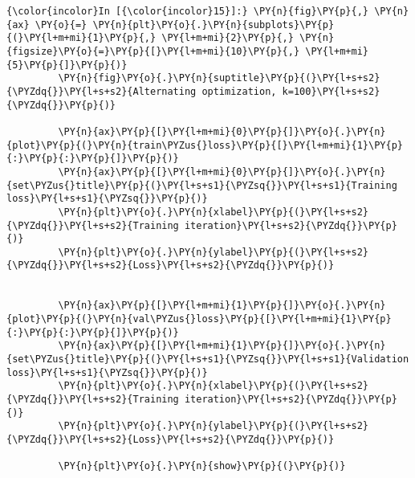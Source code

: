     \begin{Verbatim}[commandchars=\\\{\}]
{\color{incolor}In [{\color{incolor}15}]:} \PY{n}{fig}\PY{p}{,} \PY{n}{ax} \PY{o}{=} \PY{n}{plt}\PY{o}{.}\PY{n}{subplots}\PY{p}{(}\PY{l+m+mi}{1}\PY{p}{,} \PY{l+m+mi}{2}\PY{p}{,} \PY{n}{figsize}\PY{o}{=}\PY{p}{[}\PY{l+m+mi}{10}\PY{p}{,} \PY{l+m+mi}{5}\PY{p}{]}\PY{p}{)}
         \PY{n}{fig}\PY{o}{.}\PY{n}{suptitle}\PY{p}{(}\PY{l+s+s2}{\PYZdq{}}\PY{l+s+s2}{Alternating optimization, k=100}\PY{l+s+s2}{\PYZdq{}}\PY{p}{)}
         
         \PY{n}{ax}\PY{p}{[}\PY{l+m+mi}{0}\PY{p}{]}\PY{o}{.}\PY{n}{plot}\PY{p}{(}\PY{n}{train\PYZus{}loss}\PY{p}{[}\PY{l+m+mi}{1}\PY{p}{:}\PY{p}{:}\PY{p}{]}\PY{p}{)}
         \PY{n}{ax}\PY{p}{[}\PY{l+m+mi}{0}\PY{p}{]}\PY{o}{.}\PY{n}{set\PYZus{}title}\PY{p}{(}\PY{l+s+s1}{\PYZsq{}}\PY{l+s+s1}{Training loss}\PY{l+s+s1}{\PYZsq{}}\PY{p}{)}
         \PY{n}{plt}\PY{o}{.}\PY{n}{xlabel}\PY{p}{(}\PY{l+s+s2}{\PYZdq{}}\PY{l+s+s2}{Training iteration}\PY{l+s+s2}{\PYZdq{}}\PY{p}{)}
         \PY{n}{plt}\PY{o}{.}\PY{n}{ylabel}\PY{p}{(}\PY{l+s+s2}{\PYZdq{}}\PY{l+s+s2}{Loss}\PY{l+s+s2}{\PYZdq{}}\PY{p}{)}
         
         
         \PY{n}{ax}\PY{p}{[}\PY{l+m+mi}{1}\PY{p}{]}\PY{o}{.}\PY{n}{plot}\PY{p}{(}\PY{n}{val\PYZus{}loss}\PY{p}{[}\PY{l+m+mi}{1}\PY{p}{:}\PY{p}{:}\PY{p}{]}\PY{p}{)}
         \PY{n}{ax}\PY{p}{[}\PY{l+m+mi}{1}\PY{p}{]}\PY{o}{.}\PY{n}{set\PYZus{}title}\PY{p}{(}\PY{l+s+s1}{\PYZsq{}}\PY{l+s+s1}{Validation loss}\PY{l+s+s1}{\PYZsq{}}\PY{p}{)}
         \PY{n}{plt}\PY{o}{.}\PY{n}{xlabel}\PY{p}{(}\PY{l+s+s2}{\PYZdq{}}\PY{l+s+s2}{Training iteration}\PY{l+s+s2}{\PYZdq{}}\PY{p}{)}
         \PY{n}{plt}\PY{o}{.}\PY{n}{ylabel}\PY{p}{(}\PY{l+s+s2}{\PYZdq{}}\PY{l+s+s2}{Loss}\PY{l+s+s2}{\PYZdq{}}\PY{p}{)}
         
         \PY{n}{plt}\PY{o}{.}\PY{n}{show}\PY{p}{(}\PY{p}{)}
\end{Verbatim}

    \begin{center}
    \end{center}
    { \hspace*{\fill} \\}
    

    
